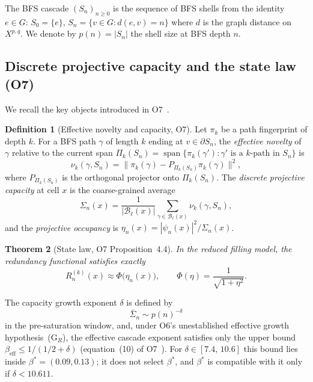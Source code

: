 \documentclass[11pt,a4paper]{article}
\newtheorem{theorem}{Theorem}[section]
\theoremstyle{definition}
\newtheorem{definition}[theorem]{Definition}
\theoremstyle{remark}
\DeclareMathOperator{\Span}{span}
\newcommand{\bSigma}{\bar{\Sigma}}
\newcommand{\betaeff}{\beta_{\mathrm{eff}}}
\newcommand{\Rn}{R_n^{(k)}}
\newcommand{\etan}{\eta_n}
\newcommand{\Sigman}{\Sigma_n}
\begin{document}
    The BFS cascade $(S_n)_{n \geq 0}$ is the sequence of BFS shells from the identity
    $e \in G$: $S_0 = \{e\}$, $S_n = \{v \in G : d(e,v) = n\}$ where $d$ is the graph
    distance on $X^{p,q}$.
    We denote by $p(n) = |S_n|$ the shell size at BFS depth $n$.

  \subsection{Discrete projective capacity and the state law (O7)}
    \label{sec:background-o7}

    We recall the key objects introduced in O7~\cite{Beau2026a11}.

    \begin{definition}[Effective novelty and capacity, O7]
      \label{def:capacity-o7}
      Let $\pi_k$ be a path fingerprint of depth $k$.
      For a BFS path $\gamma$ of length $k$ ending at $v \in \partial S_n$, the
      \emph{effective novelty} of $\gamma$ relative to the current span
      $\Pi_k(S_n) = \Span\{\pi_k(\gamma') : \gamma' \text{ is a }k\text{-path in }S_n\}$ is
      \[
        \nu_k(\gamma, S_n) = \bigl\|\pi_k(\gamma) - P_{\Pi_k(S_n)}\pi_k(\gamma)\bigr\|^2,
      \]
      where $P_{\Pi_k(S_n)}$ is the orthogonal projector onto $\Pi_k(S_n)$.
      The \emph{discrete projective capacity} at cell $x$ is the coarse-grained average
      \[
        \Sigman(x) = \frac{1}{|\mathcal{B}_\ell(x)|} \sum_{\gamma \in \mathcal{B}_\ell(x)}
        \nu_k(\gamma, S_n),
      \]
      and the \emph{projective occupancy} is $\etan(x) = |\psi_n(x)|^2 / \Sigman(x)$.
    \end{definition}

    \begin{theorem}[State law, O7 Proposition~4.4]
      \label{thm:statelaw}
      In the reduced filling model, the redundancy functional satisfies exactly
      \[
        \Rn(x) \approx \Phi\bigl(\etan(x)\bigr), \qquad
        \Phi(\eta) = \frac{1}{\sqrt{1+\eta^2}}.
      \]
    \end{theorem}

    The capacity growth exponent $\delta$ is defined by
    \begin{equation}
      \bSigma_n \sim p(n)^{-\delta}
      \label{eq:capacity-growth}
    \end{equation}
    in the pre-saturation window, and, under O6's unestablished effective growth
    hypothesis~(G$_R$), the effective cascade exponent satisfies only the upper bound
    $\betaeff \leq 1/(1/2 + \delta)$ (equation~(10) of O7~\cite{Beau2026a11}).
    For $\delta \in [7.4,\,10.6]$ this bound lies inside $\beta^* = (0.09, 0.13)$; it does not select
    $\beta^*$, and $\beta^*$ is compatible with it only if $\delta < 10.611$.
\end{document}
